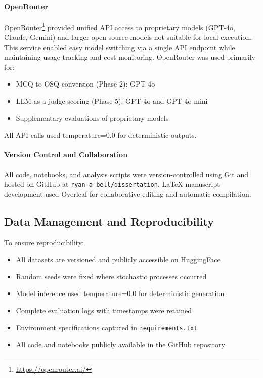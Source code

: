 \paragraph{OpenRouter} OpenRouter\footnote{\url{https://openrouter.ai/}} provided unified API access to proprietary models (GPT-4o, Claude, Gemini) and larger open-source models not suitable for local execution. This service enabled easy model switching via a single API endpoint while maintaining usage tracking and cost monitoring. OpenRouter was used primarily for:
\begin{itemize}
    \item MCQ to OSQ conversion (Phase 2): GPT-4o
    \item LLM-as-a-judge scoring (Phase 5): GPT-4o and GPT-4o-mini
    \item Supplementary evaluations of proprietary models
\end{itemize}

All API calls used temperature=0.0 for deterministic outputs.

\paragraph{Version Control and Collaboration} All code, notebooks, and analysis scripts were version-controlled using Git and hosted on GitHub at \texttt{ryan-a-bell/dissertation}. LaTeX manuscript development used Overleaf for collaborative editing and automatic compilation.

\subsection{Data Management and Reproducibility}

To ensure reproducibility:
\begin{itemize}
    \item All datasets are versioned and publicly accessible on HuggingFace
    \item Random seeds were fixed where stochastic processes occurred
    \item Model inference used temperature=0.0 for deterministic generation
    \item Complete evaluation logs with timestamps were retained
    \item Environment specifications captured in \texttt{requirements.txt}
    \item All code and notebooks publicly available in the GitHub repository
\end{itemize}

